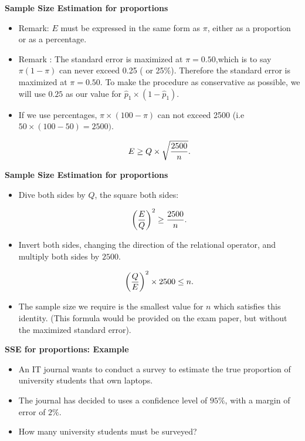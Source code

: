 
\textbf{Sample Size Estimation for proportions}
\begin{itemize}
\item Remark: $E$ must be expressed in the same form as $\pi$, either as a proportion or as a percentage.
\item Remark : The standard error is maximized at $\pi = 0.50$,which is to say $\pi(1-\pi)$ can never exceed 0.25 ( or 25\%). Therefore the standard error is maximized at $\pi = 0.50$. To make the procedure as conservative as possible, we will use $0.25$ as our value for $\hat{p}_1 \times (1 - \hat{p}_1)$.
\item If we use percentages, $\pi \times (100-\pi)$ can not exceed 2500 (i.e $ 50 \times (100-50)=2500)$.

\[ E \geq Q \times \sqrt{{2500 \over n}}. \]


\end{itemize}



\textbf{Sample Size Estimation for proportions}

\begin{itemize}

\item Dive both sides by $Q$, the square both sides:

\[ \left({E\over Q}\right)^2 \geq {2500 \over n}. \]

\item Invert both sides, changing the direction of the relational operator, and multiply both sides by $2500$.

\[ \left({Q\over E}\right)^2 \times 2500 \leq n. \]

\item The sample size we require is the smallest value for $n$ which satisfies this identity. (This formula would be provided on the exam paper, but without the maximized standard error).
\end{itemize}


\textbf{SSE for proportions: Example}
\begin{itemize}
\item An IT journal wants to conduct a survey to estimate the true proportion of university students that own laptops.
\item The journal has decided to uses a confidence level of $95\%$, with a margin of error of $2\%$.
\item How many university students must be surveyed?
\end{itemize}


